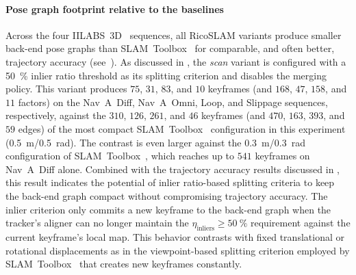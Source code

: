 \paragraph{Pose graph footprint relative to the baselines}
Across the four IILABS~3D~\cite{ribeiro:access:2025} sequences, all
RicoSLAM variants produce smaller back-end pose graphs than
SLAM~Toolbox~\cite{macenski-jambrecic:joss:2021} for comparable, and often
better, trajectory accuracy (see~).
As discussed in ,
the \emph{scan} variant is configured with a \SI{50}{\percent} inlier ratio
threshold as its splitting criterion and disables the merging policy.
This variant produces $75$, $31$, $83$, and $10$ keyframes (and $168$,
$47$, $158$, and $11$ factors) on the Nav~A~Diff, Nav~A~Omni,
Loop, and Slippage sequences, respectively, against the $310$, $126$,
$261$, and $46$ keyframes (and $470$, $163$, $393$, and $59$ edges)
of the most compact SLAM~Toolbox~\cite{macenski-jambrecic:joss:2021}
configuration in this experiment (\SI{0.5}{\metre}/\SI{0.5}{\radian}).
The contrast is even larger against the \SI{0.3}{\metre}/\SI{0.3}{\radian}
configuration of SLAM~Toolbox~\cite{macenski-jambrecic:joss:2021}, which
reaches up to $541$ keyframes on Nav~A~Diff alone.
Combined with the trajectory accuracy results discussed in
, this result indicates the
potential of inlier ratio-based splitting criteria to keep the back-end
graph compact without compromising trajectory accuracy. The inlier criterion
only commits a new keyframe to the back-end graph when the tracker's aligner can
no longer maintain the $\eta_{\mathrm{inliers}} \ge \SI{50}{\percent}$
requirement against the current keyframe's local map.
This behavior contrasts with fixed translational or rotational displacements as
in the viewpoint-based splitting criterion employed by
SLAM~Toolbox~\cite{macenski-jambrecic:joss:2021} that creates new keyframes
constantly.

